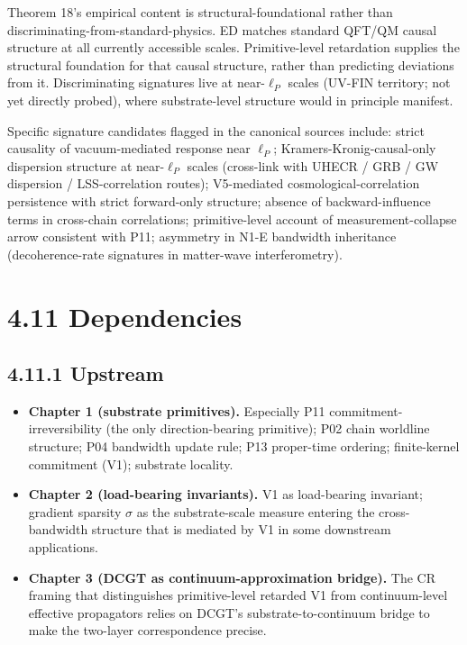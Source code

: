 \documentclass[11pt]{book}
\begin{document}
Theorem 18's empirical content is structural-foundational rather than discriminating-from-standard-physics. ED matches standard QFT/QM causal structure at all currently accessible scales. Primitive-level retardation supplies the structural foundation for that causal structure, rather than predicting deviations from it. Discriminating signatures live at near-$\ell_P$ scales (UV-FIN territory; not yet directly probed), where substrate-level structure would in principle manifest.

Specific signature candidates flagged in the canonical sources include: strict causality of vacuum-mediated response near $\ell_P$; Kramers-Kronig-causal-only dispersion structure at near-$\ell_P$ scales (cross-link with UHECR / GRB / GW dispersion / LSS-correlation routes); V5-mediated cosmological-correlation persistence with strict forward-only structure; absence of backward-influence terms in cross-chain correlations; primitive-level account of measurement-collapse arrow consistent with P11; asymmetry in N1-E bandwidth inheritance (decoherence-rate signatures in matter-wave interferometry).

\section{4.11 Dependencies}

\subsection{4.11.1 Upstream}

\begin{itemize}
\item \textbf{Chapter 1 (substrate primitives).} Especially P11 commitment-irreversibility (the only direction-bearing primitive); P02 chain worldline structure; P04 bandwidth update rule; P13 proper-time ordering; finite-kernel commitment (V1); substrate locality.
\item \textbf{Chapter 2 (load-bearing invariants).} V1 as load-bearing invariant; gradient sparsity $\sigma$ as the substrate-scale measure entering the cross-bandwidth structure that is mediated by V1 in some downstream applications.
\item \textbf{Chapter 3 (DCGT as continuum-approximation bridge).} The CR framing that distinguishes primitive-level retarded V1 from continuum-level effective propagators relies on DCGT's substrate-to-continuum bridge to make the two-layer correspondence precise.
\end{itemize}
\end{document}

